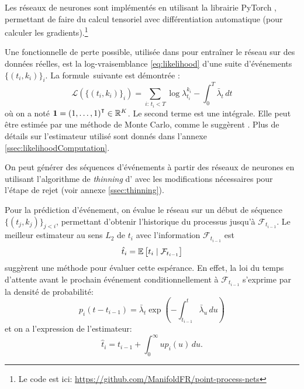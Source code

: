 \documentclass[../main.tex]{subfiles}
\begin{document}
	
Les réseaux de neurones sont implémentés en utilisant la librairie \textsf{PyTorch} \cite{paszke2017automatic}, permettant de faire du calcul tensoriel avec différentiation automatique (pour calculer les gradients).\footnote{Le code est ici: \url{https://github.com/ManifoldFR/point-process-nets}}

Une fonctionnelle de perte possible, utilisée dans \autocite{meiEisnerNeuralHawkes} pour entraîner le réseau sur des données réelles, est la log-vraisemblance \eqref{eq:likelihood} d'une suite d'événements $\{(t_i,k_i)\}_i$. La formule\footnotemark~suivante est démontrée \cite[15]{meiEisnerNeuralHawkes}: 
\begin{equation}\label{eq:explicitLikelihood}
\mathcal{L}\left(\{(t_i,k_i)\}_i\right)
=
\sum_{i:\, t_i < T} \log\lambda^{k_i}_{t_i} - \int_0^T \bar\lambda_t\,dt
\end{equation}
où on a noté $\mathbf{1} = {(1,\ldots,1)}^\intercal\in\mathbb{R}^K$. Le second terme est une intégrale. Elle peut être estimée par une méthode de Monte Carlo, comme le suggèrent \citeauthor{meiEisnerNeuralHawkes}. Plus de détails sur l'estimateur utilisé sont donnés dans l'annexe \ref{ssec:likelihoodComputation}.


On peut générer des séquences d'événements à partir des réseaux de neurones en utilisant l'algorithme de \textit{thinning} d'\citeauthor{ogata1981} \autocite{ogata1981} avec les modifications nécessaires pour l'étape de rejet (voir annexe \ref{ssec:thinning}).

Pour la prédiction d'événement, on évalue le réseau sur un début de séquence $\{(t_j,k_j)\}_{j < i}$, permettant d'obtenir l'historique du processus jusqu'à $\mathcal{F}_{t_{i-1}}$. Le meilleur estimateur au sens $L_2$ de $t_i$ avec l'information $\mathcal{F}_{t_{i-1}}$ est
\[
	\hat{t}_i = \mathbb{E}\left[ t_i \mid \mathcal{F}_{t_{i-1}} \right]
\]
\citeauthor{meiEisnerNeuralHawkes} suggèrent une méthode pour évaluer cette espérance. En effet, la loi du temps d'attente avant le prochain événement conditionnellement à $\mathcal{F}_{t_{i-1}}$ s'exprime par la densité de probabilité:
\begin{equation}\label{eq:nextIncrementDensity}
	p_i(t-t_{i-1}) = \bar\lambda_t\exp\left(-\int_{t_{i-1}}^t\bar\lambda_u\,du\right)
\end{equation}
et on a l'expression de l'estimateur:
\begin{equation}\label{eq:nextEventTimeEstimator}
	\hat{t}_i = t_{i-1} + \int_0^\infty u p_i(u)\,du.
\end{equation}
\end{document}
